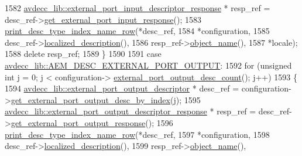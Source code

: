 \begin{DoxyCode}
1582                 \hyperlink{classavdecc__lib_1_1external__port__input__descriptor__response}{avdecc\_lib::external\_port\_input\_descriptor\_response}
       * resp\_ref = desc\_ref->\hyperlink{classavdecc__lib_1_1external__port__input__descriptor_a9402343ba692ce790343f2b5cbcef0c7}{get\_external\_port\_input\_response}();
1583                 \hyperlink{classcmd__line_ac47c21c03b69593b74e7c43201d0ba41}{print\_desc\_type\_index\_name\_row}(*desc\_ref,
1584                                                *configuration,
1585                                                desc\_ref->\hyperlink{classavdecc__lib_1_1descriptor__base_a1fb9de45567df344090a1407aa6b775f}{localized\_description}(),
1586                                                resp\_ref->\hyperlink{classavdecc__lib_1_1descriptor__response__base_a133f7774946d80f82b8aaaa4cfbb7361}{object\_name}(),
1587                                                *locale);
1588                 \textcolor{keyword}{delete} resp\_ref;
1589             \}
1590 
1591         \textcolor{keywordflow}{case} \hyperlink{namespaceavdecc__lib_ac7b7d227e46bc72b63ee9e9aae15902fa60159ed7fb6c5bf542208f134c202c67}{avdecc\_lib::AEM\_DESC\_EXTERNAL\_PORT\_OUTPUT}:
1592             \textcolor{keywordflow}{for} (\textcolor{keywordtype}{unsigned} \textcolor{keywordtype}{int} j = 0; j < configuration->
      \hyperlink{classavdecc__lib_1_1configuration__descriptor_aca2a0ab2856be16f3e928c5441f69df8}{external\_port\_output\_desc\_count}(); j++)
1593             \{
1594                 \hyperlink{classavdecc__lib_1_1external__port__output__descriptor}{avdecc\_lib::external\_port\_output\_descriptor} * 
      desc\_ref = configuration->\hyperlink{classavdecc__lib_1_1configuration__descriptor_a58f09b090b126e803061158bf1e22c5e}{get\_external\_port\_output\_desc\_by\_index}(j);
1595                 \hyperlink{classavdecc__lib_1_1external__port__output__descriptor__response}{avdecc\_lib::external\_port\_output\_descriptor\_response}
       * resp\_ref = desc\_ref->\hyperlink{classavdecc__lib_1_1external__port__output__descriptor_affbd1deb9db87132131a3ca9e7eb8c3f}{get\_external\_port\_output\_response}();
1596                 \hyperlink{classcmd__line_ac47c21c03b69593b74e7c43201d0ba41}{print\_desc\_type\_index\_name\_row}(*desc\_ref,
1597                                                *configuration,
1598                                                desc\_ref->\hyperlink{classavdecc__lib_1_1descriptor__base_a1fb9de45567df344090a1407aa6b775f}{localized\_description}(),
1599                                                resp\_ref->\hyperlink{classavdecc__lib_1_1descriptor__response__base_a133f7774946d80f82b8aaaa4cfbb7361}{object\_name}(),

\end{DoxyCode}
